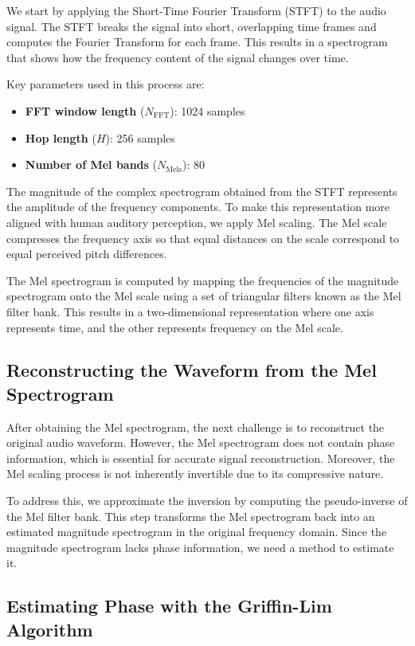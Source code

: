 \documentclass[12pt]{article}
\begin{document}
We start by applying the Short-Time Fourier Transform (STFT) to the audio signal. The STFT breaks the signal into short, overlapping time frames and computes the Fourier Transform for each frame. This results in a spectrogram that shows how the frequency content of the signal changes over time.

Key parameters used in this process are:

\begin{itemize}
    \item \textbf{FFT window length} (\(N_{\text{FFT}}\)): 1024 samples
    \item \textbf{Hop length} (\(H\)): 256 samples
    \item \textbf{Number of Mel bands} (\(N_{\text{Mels}}\)): 80
\end{itemize}

The magnitude of the complex spectrogram obtained from the STFT represents the amplitude of the frequency components. To make this representation more aligned with human auditory perception, we apply Mel scaling. The Mel scale compresses the frequency axis so that equal distances on the scale correspond to equal perceived pitch differences.

The Mel spectrogram is computed by mapping the frequencies of the magnitude spectrogram onto the Mel scale using a set of triangular filters known as the Mel filter bank. This results in a two-dimensional representation where one axis represents time, and the other represents frequency on the Mel scale.

\subsection{Reconstructing the Waveform from the Mel Spectrogram}

After obtaining the Mel spectrogram, the next challenge is to reconstruct the original audio waveform. However, the Mel spectrogram does not contain phase information, which is essential for accurate signal reconstruction. Moreover, the Mel scaling process is not inherently invertible due to its compressive nature.

To address this, we approximate the inversion by computing the pseudo-inverse of the Mel filter bank. This step transforms the Mel spectrogram back into an estimated magnitude spectrogram in the original frequency domain. Since the magnitude spectrogram lacks phase information, we need a method to estimate it.

\subsection{Estimating Phase with the Griffin-Lim Algorithm}
\end{document}
